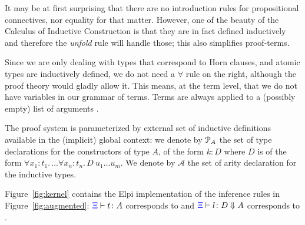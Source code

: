 It may be at first surprising that there are no introduction rules for
propositional connectives, nor equality for that matter. However, one of the beauty of the Calculus of Inductive Construction is that they are in fact defined inductively and therefore the \emph{unfold} rule will handle those; this also simplifies proof-terms.

Since we are only dealing with types that correspond to Horn clauses, and
atomic types are inductively defined, we do not need a $\forall$ rule on the right, although the proof theory would gladly allow it. This means, at the term level, that we
do not have variables in our grammar of terms. Terms are always
applied to a (possibly empty) list of arguments%
.

The proof system is parameterized by  external set of inductive definitions available in
the (implicit) global context: we denote by ${\mathcal P}_A$ the set of type declarations for the
constructors of type $A$, of the form $k : D$ where $D$ is of the form
$\forall x_1 : t_1.\, \dots \forall x_n : t_n.\, D\ u_1 \dots u_m$. We denote
by $\mathcal{A}$ the set of arity declaration for the inductive types.

%
%

Figure~\ref{fig:kernel} contains the Elpi implementation of the
inference rules in Figure~\ref{fig:augmented}: ${\color{blue}{\Xi}}\vdash t \colon A$ corresponds to
 and ${\color{blue}{\Xi}}\vdash l \colon D \Downarrow A$ corresponds to
.

